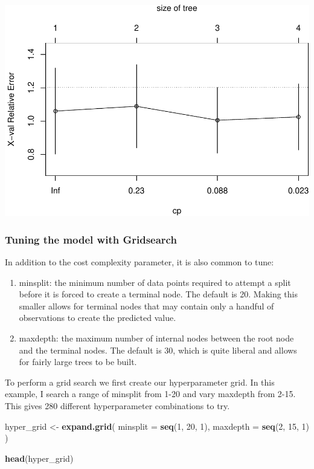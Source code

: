 \documentclass[]{article}
\newenvironment{Shaded}{\begin{snugshade}}{\end{snugshade}}
\newcommand{\KeywordTok}[1]{\textcolor[rgb]{0.13,0.29,0.53}{\textbf{#1}}}
\newcommand{\DataTypeTok}[1]{\textcolor[rgb]{0.13,0.29,0.53}{#1}}
\newcommand{\DecValTok}[1]{\textcolor[rgb]{0.00,0.00,0.81}{#1}}
\newcommand{\StringTok}[1]{\textcolor[rgb]{0.31,0.60,0.02}{#1}}
\newcommand{\NormalTok}[1]{#1}
\providecommand{\tightlist}{%
  \setlength{\itemsep}{0pt}\setlength{\parskip}{0pt}}
\begin{document}
\includegraphics{HW7_files/figure-latex/unnamed-chunk-5-1.pdf}

\subsubsection{Tuning the model with
Gridsearch}\label{tuning-the-model-with-gridsearch}

In addition to the cost complexity parameter, it is also common to tune:

\begin{enumerate}
\def\labelenumi{\arabic{enumi}.}
\tightlist
\item
  minsplit: the minimum number of data points required to attempt a
  split before it is forced to create a terminal node. The default is
  20. Making this smaller allows for terminal nodes that may contain
  only a handful of observations to create the predicted value.
\item
  maxdepth: the maximum number of internal nodes between the root node
  and the terminal nodes. The default is 30, which is quite liberal and
  allows for fairly large trees to be built.
\end{enumerate}

To perform a grid search we first create our hyperparameter grid. In
this example, I search a range of minsplit from 1-20 and vary maxdepth
from 2-15. This gives 280 different hyperparameter combinations to try.

\begin{Shaded}
\begin{Highlighting}[]
\NormalTok{hyper_grid <-}\StringTok{ }\KeywordTok{expand.grid}\NormalTok{(}
  \DataTypeTok{minsplit =} \KeywordTok{seq}\NormalTok{(}\DecValTok{1}\NormalTok{, }\DecValTok{20}\NormalTok{, }\DecValTok{1}\NormalTok{),}
  \DataTypeTok{maxdepth =} \KeywordTok{seq}\NormalTok{(}\DecValTok{2}\NormalTok{, }\DecValTok{15}\NormalTok{, }\DecValTok{1}\NormalTok{)}
\NormalTok{)}

\KeywordTok{head}\NormalTok{(hyper_grid)}
\end{Highlighting}
\end{Shaded}
\end{document}
